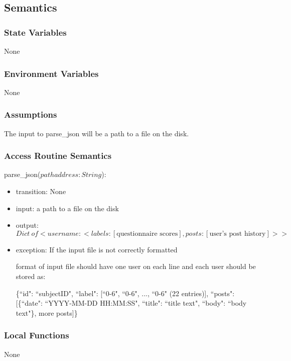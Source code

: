 \documentclass[12pt, titlepage]{article}
\begin{document}
\subsection{Semantics}

\subsubsection{State Variables}

None

\subsubsection{Environment Variables}

None

\subsubsection{Assumptions}

The input to parse\_json will be a path to a file on the disk.

\subsubsection{Access Routine Semantics}

\noindent parse\_json($pathaddress: String$):
\begin{itemize}
\item transition: None
\item input: a path to a file on the disk
\item output: $Dict\ of <username: <labels: [\text{questionnaire scores}],  posts: [\text{user's post history}]>>$
\item exception: If the input file is not correctly formatted

format of input file should have one user on each line and each user should be stored as:

\{``id": ``subjectID", ``label": [``0-6", ``0-6", ..., ``0-6" (22 entries)], ``posts": [\{``date": ``YYYY-MM-DD HH:MM:SS", ``title": ``title text", ``body": ``body text"\}, more posts]\}
\end{itemize}

\subsubsection{Local Functions}

None
\end{document}
